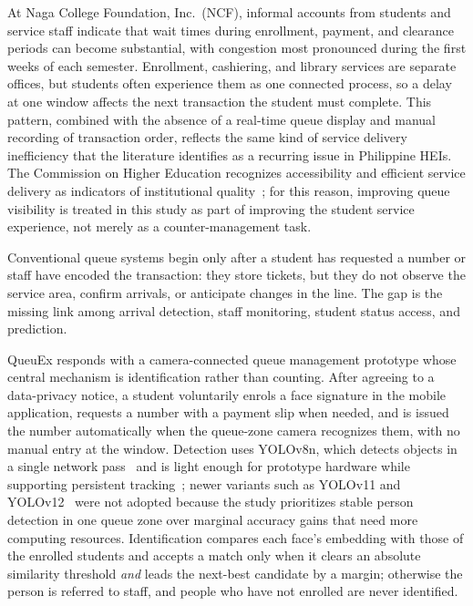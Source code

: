 \documentclass{research}
\newcommand{\sysname}{QueuEx}
\begin{document}
At Naga College Foundation, Inc.\ (NCF), informal accounts from students and service staff indicate that wait times during enrollment, payment, and clearance periods can become substantial, with congestion most pronounced during the first weeks of each semester. Enrollment, cashiering, and library services are separate offices, but students often experience them as one connected process, so a delay at one window affects the next transaction the student must complete. This pattern, combined with the absence of a real-time queue display and manual recording of transaction order, reflects the same kind of service delivery inefficiency that the literature identifies as a recurring issue in Philippine HEIs. The Commission on Higher Education recognizes accessibility and efficient service delivery as indicators of institutional quality~\cite{ched2022}; for this reason, improving queue visibility is treated in this study as part of improving the student service experience, not merely as a counter-management task.

Conventional queue systems begin only after a student has requested a
number or staff have encoded the transaction: they store tickets, but
they do not observe the service area, confirm arrivals, or anticipate
changes in the line. The gap is the missing link among arrival
detection, staff monitoring, student status access, and prediction.

\sysname{} responds with a camera-connected queue management prototype
whose central mechanism is identification rather than counting. After
agreeing to a data-privacy notice, a student voluntarily enrols a face
signature in the mobile application, requests a number with a payment
slip when needed, and is issued the number automatically when the
queue-zone camera recognizes them, with no manual entry at the window.
Detection uses YOLOv8n, which detects objects in a single network
pass~\cite{redmon2018} and is light enough for prototype hardware while
supporting persistent tracking~\cite{zhang2022bytetrack,jocher2023,wang2025lightweight};
newer variants such as YOLOv11 and
YOLOv12~\cite{jocher2024yolo11,tian2025yolov12} were not adopted because
the study prioritizes stable person detection in one queue zone over
marginal accuracy gains that need more computing resources.
Identification compares each face's embedding with those of the enrolled
students and accepts a match only when it clears an absolute similarity
threshold \emph{and} leads the next-best candidate by a margin; otherwise
the person is referred to staff, and people who have not enrolled are
never identified.
\end{document}
